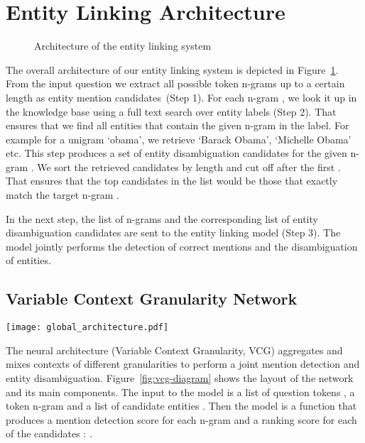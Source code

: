 \documentclass[11pt,a4paper]{article}
\begin{document}
\section{Entity Linking Architecture}
\label{sec:architecture}

\begin{figure}[ht]
  \caption{Architecture of the entity linking system}
  \label{fig:system-diagram}
\end{figure}

The overall architecture of our entity linking system is depicted in Figure~\ref{fig:system-diagram}. From the input question  we extract all possible token n-grams  up to a certain length as entity mention candidates~(Step 1). For each n-gram , we look it up in the knowledge base using a full text search over entity labels (Step 2). That ensures that we find all entities that contain the given n-gram in the label. For example for a unigram `obama',  we retrieve `Barack Obama', `Michelle Obama' etc. 
This step produces a set of entity disambiguation candidates  for the given n-gram . We sort the retrieved candidates by length and cut off after the first . 
That ensures that the top candidates in the list would be those that exactly match the target n-gram . 

In the next step, the list of n-grams  and the corresponding list of entity disambiguation candidates are sent to the entity linking model (Step 3). 
The model jointly performs the detection of correct mentions and the disambiguation of entities. 

\subsection{Variable Context Granularity Network}

\begin{figure*}[t]
  {\centering
   \texttt{[image: global\_architecture.pdf]}}
  \caption{The architecture of the Variable Context Granularity Network for a \textit{single} n-gram and an entity candidate. The output vectors  are aggregated over \textit{all} n-grams for the global assignment \label{fig:vcg-diagram}}
\end{figure*}

The neural architecture (Variable Context Granularity, VCG) aggregates and mixes contexts of different granularities to perform a joint mention detection and entity disambiguation. 
Figure~\ref{fig:vcg-diagram} shows the layout of the network and its main components.
The input to the model is a list of question tokens , a token n-gram  and a list of candidate entities . Then the model is a function  that produces a mention detection score  for each n-gram and a ranking score  for each of the candidates : . 
\end{document}

